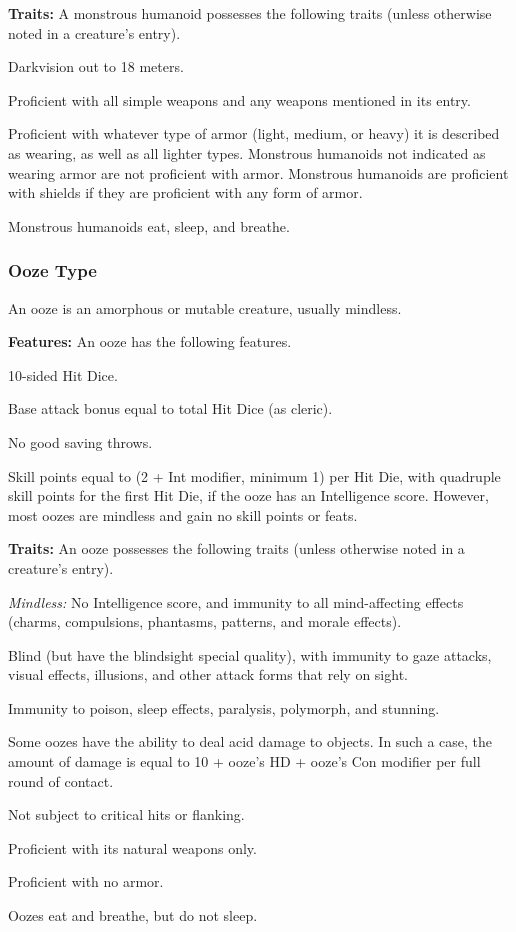 \textbf{Traits:} A monstrous humanoid possesses the following traits (unless otherwise noted in a creature's entry).
\begin{itemize*}
\item Darkvision out to 18 meters.
\item Proficient with all simple weapons and any weapons mentioned in its entry.
\item Proficient with whatever type of armor (light, medium, or heavy) it is described as wearing, as well as all lighter types. Monstrous humanoids not indicated as wearing armor are not proficient with armor. Monstrous humanoids are proficient with shields if they are proficient with any form of armor.
\item Monstrous humanoids eat, sleep, and breathe.
\end{itemize*}

\subsubsection{Ooze Type}
An ooze is an amorphous or mutable creature, usually mindless.

\textbf{Features:} An ooze has the following features.
\begin{itemize*}
\item 10-sided Hit Dice.
\item Base attack bonus equal to \threequarters total Hit Dice (as cleric).
\item No good saving throws.
\item Skill points equal to (2 + Int modifier, minimum 1) per Hit Die, with quadruple skill points for the first Hit Die, if the ooze has an Intelligence score. However, most oozes are mindless and gain no skill points or feats.
\end{itemize*}

\textbf{Traits:} An ooze possesses the following traits (unless otherwise noted in a creature's entry).
\begin{itemize*}
\item \textit{Mindless:} No Intelligence score, and immunity to all mind-affecting effects (charms, compulsions, phantasms, patterns, and morale effects).
\item Blind (but have the blindsight special quality), with immunity to gaze attacks, visual effects, illusions, and other attack forms that rely on sight.
\item Immunity to poison, sleep effects, paralysis, polymorph, and stunning.
\item Some oozes have the ability to deal acid damage to objects. In such a case, the amount of damage is equal to 10 + \onehalf ooze's HD + ooze's Con modifier per full round of contact.
\item Not subject to critical hits or flanking.
\item Proficient with its natural weapons only.
\item Proficient with no armor.
\item Oozes eat and breathe, but do not sleep.
\end{itemize*}

